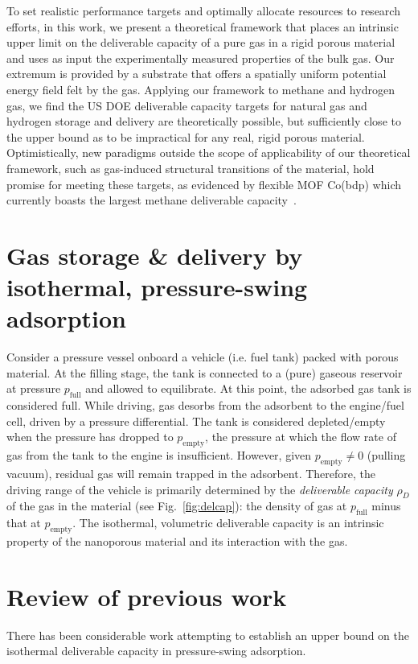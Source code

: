 \documentclass[twoside,twocolumn,9pt]{article}
\newcommand\pfull{\ensuremath{p_{\text{full}}}}
\newcommand\pempty{\ensuremath{p_{\text{empty}}}}
\begin{document}
To set realistic performance targets and optimally allocate resources to research efforts,
in this work, we present a theoretical framework that places an intrinsic upper
limit on the deliverable capacity of a pure gas in a rigid porous material and
uses as input the experimentally measured properties of the bulk gas. Our
extremum is provided by a substrate that offers a spatially uniform potential
energy field felt by the gas. Applying our framework to methane and hydrogen
gas, we find the US DOE deliverable capacity targets for natural gas and
hydrogen storage and delivery are theoretically possible, but sufficiently
close to the upper bound as to be impractical for any real, rigid porous
material. Optimistically, new paradigms outside the scope of applicability of
our theoretical framework, such as gas-induced structural transitions of the
material, hold promise for meeting these targets, as evidenced by flexible MOF
Co(bdp) which currently boasts the largest methane deliverable
capacity~\cite{mason2015methane}.

\section{Gas storage \& delivery by isothermal, pressure-swing adsorption}
Consider a pressure vessel onboard a vehicle (i.e. fuel tank) packed with
porous material. At the filling stage, the tank is connected to a (pure)
gaseous reservoir at pressure $\pfull$ and allowed to equilibrate. At this
point, the adsorbed gas tank is considered full. While driving, gas desorbs
from the adsorbent to the engine/fuel cell, driven by a pressure differential.
The tank is considered depleted/empty when the pressure has dropped to
$\pempty$, the pressure at which the flow rate of gas from the tank to the
engine is insufficient. However, given $\pempty \neq 0$ (pulling vacuum),
residual gas will remain trapped in the adsorbent. Therefore, the driving range
of the vehicle is primarily determined by the \emph{deliverable capacity} $\rho_D$ of
the gas in the material (see Fig.~\ref{fig:delcap}): the density of gas at
$\pfull$ minus that at $\pempty$. The isothermal, volumetric deliverable
capacity is an intrinsic property of the nanoporous material and its
interaction with the gas.

\section{Review of previous work}
There has been considerable work attempting to establish an upper bound on the
isothermal deliverable capacity in pressure-swing adsorption.
\end{document}
